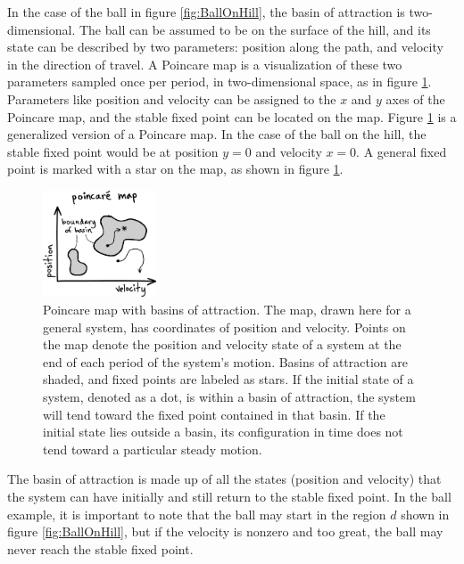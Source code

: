 In the case of the ball in figure \ref{fig:BallOnHill}, the basin of attraction
is two-dimensional. The ball can be assumed to be on the surface of the hill,
and its state can be described by two parameters: position along the path, and
velocity in the direction of travel. A Poincare map is a visualization of these
two parameters sampled once per period, in two-dimensional space, as in figure
\ref{fig:BasinOfAttraction}. Parameters like position and velocity can be
assigned to the $x$ and $y$ axes of the Poincare map, and the stable fixed
point can be located on the map. Figure \ref{fig:BasinOfAttraction} is a
generalized version of a Poincare map. In the case of the ball on the hill, the
stable fixed point would be at position $y = 0$ and velocity $x = 0$. A general
fixed point is marked with a star on the map, as shown in figure \ref{fig:BasinOfAttraction}. 

\begin{figure}[h]		%
\begin{centering}
\includegraphics[width=0.3\textwidth]{Figures/BasinOfAttraction}\par
\end{centering}
\caption[Diagram: Poincare Map with Basins of Attraction]{Poincare map with basins of attraction. The map, drawn here for a general system, has coordinates of position and velocity. Points on the map denote the position and velocity state of a system at the end of each period of the system's motion. Basins of attraction are shaded, and fixed points are labeled as stars. If the initial state of a system, denoted as a dot, is within a basin of attraction, the system will tend toward the fixed point contained in that basin. If the initial state lies outside a basin, its configuration in time does not tend toward a particular steady motion.}
\label{fig:BasinOfAttraction}
\end{figure}
%


The basin of attraction is made up of all the states (position and velocity)
that the system can have initially and still return to the stable fixed
point. In the ball example, it is important to note that the ball may start in
the region $d$ shown in figure \ref{fig:BallOnHill}, but if the velocity is
nonzero and too great, the ball may never reach the stable fixed point. 

